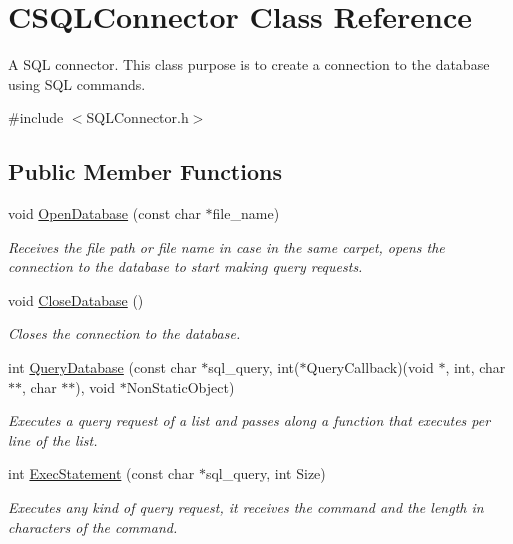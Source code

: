 \hypertarget{class_c_s_q_l_connector}{}\section{C\+S\+Q\+L\+Connector Class Reference}
\label{class_c_s_q_l_connector}


A S\+QL connector. This class purpose is to create a connection to the database using S\+QL commands.  




{\ttfamily \#include $<$S\+Q\+L\+Connector.\+h$>$}

\subsection*{Public Member Functions}
\begin{DoxyCompactItemize}
\item 
void \hyperlink{class_c_s_q_l_connector_a83834029ef01048d11ac157785c2d404}{Open\+Database} (const char $\ast$file\+\_\+name)
\begin{DoxyCompactList}\small\item\em Receives the file path or file name in case in the same carpet, opens the connection to the database to start making query requests. \end{DoxyCompactList}\item 
void \hyperlink{class_c_s_q_l_connector_a7cbbbc490b80b31f48c24ecb2da08162}{Close\+Database} ()\hypertarget{class_c_s_q_l_connector_a7cbbbc490b80b31f48c24ecb2da08162}{}\label{class_c_s_q_l_connector_a7cbbbc490b80b31f48c24ecb2da08162}

\begin{DoxyCompactList}\small\item\em Closes the connection to the database. \end{DoxyCompactList}\item 
int \hyperlink{class_c_s_q_l_connector_a4f644628dcae2d9953744663540db506}{Query\+Database} (const char $\ast$sql\+\_\+query, int($\ast$Query\+Callback)(void $\ast$, int, char $\ast$$\ast$, char $\ast$$\ast$), void $\ast$Non\+Static\+Object)
\begin{DoxyCompactList}\small\item\em Executes a query request of a list and passes along a function that executes per line of the list. \end{DoxyCompactList}\item 
int \hyperlink{class_c_s_q_l_connector_af41ad8861139b9008d856c4b384bbc5d}{Exec\+Statement} (const char $\ast$sql\+\_\+query, int Size)
\begin{DoxyCompactList}\small\item\em Executes any kind of query request, it receives the command and the length in characters of the command. \end{DoxyCompactList}\end{DoxyCompactItemize}


